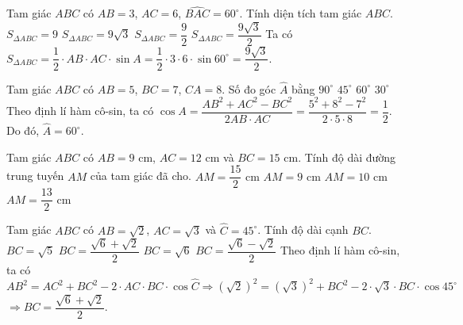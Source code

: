 \begin{ex}%
	Tam giác $ ABC$ có $ AB=3$, $AC=6$, $\widehat{BAC}=60^\circ $. Tính diện tích tam giác $ ABC$.
	\choice
	{$ S_{\Delta ABC}=9$}
	{$ S_{\Delta ABC}=9\sqrt{3}$}
	{$ S_{\Delta ABC}=\dfrac{9}{2}$}
	{\True $ S_{\Delta ABC}=\dfrac{9\sqrt{3}}{2}$}
	\loigiai
	{Ta có $ S_{\Delta ABC}=\dfrac{1}{2}\cdot AB\cdot AC\cdot \sin{A}=\dfrac{1}{2}\cdot 3\cdot 6\cdot \sin 60^\circ=\dfrac{9\sqrt{3}}{2}$.}
\end{ex}


\begin{ex}%
	Tam giác $ ABC$ có $ AB=5$, $BC=7$, $CA=8$. Số đo góc $ \widehat{A}$ bằng
	\choice
	{$ 90^\circ $}
	{$ 45^\circ $}
	{\True $ 60^\circ $}
	{$ 30^\circ $}
	\loigiai
	{Theo định lí hàm cô-sin, ta có $ \cos{A}=\dfrac{AB^2+AC^2-BC^2}{2AB\cdot AC}=\dfrac{5^2+8^2-7^2}{2\cdot 5\cdot 8}=\dfrac{1}{2}$.\\
		Do đó, $ \widehat{A}=60^\circ $.}
\end{ex}


\begin{ex}%
	Tam giác $ ABC$ có $ AB=9$ cm, $ AC=12$ cm và $ BC=15$ cm. Tính độ dài đường trung tuyến $ AM$ của tam giác đã cho.
	\choice
	{\True $ AM=\dfrac{15}{2}$ cm}
	{$ AM=9$ cm}
	{$ AM=10$ cm}
	{$ AM=\dfrac{13}{2}$ cm}
\end{ex}


\begin{ex}%
	Tam giác $ ABC$ có $ AB=\sqrt{2}$, $AC=\sqrt{3}$ và $ \widehat{C}=45^\circ $. Tính độ dài cạnh $ BC$.
	\choice
	{$ BC=\sqrt{5}$}
	{\True $ BC=\dfrac{\sqrt{6}+\sqrt{2}}{2}$}
	{$ BC=\sqrt{6}$}
	{$ BC=\dfrac{\sqrt{6}-\sqrt{2}}{2}$}
	\loigiai
	{Theo định lí hàm cô-sin, ta có\\
		$ AB^2=AC^2+BC^2-2\cdot AC\cdot BC\cdot \cos \widehat{C}\Rightarrow {(\sqrt{2} )}^2={(\sqrt{3} )}^2+BC^2-2\cdot \sqrt{3}\cdot BC\cdot \cos 45^\circ $ \\
		$ \Rightarrow BC=\dfrac{\sqrt{6}+\sqrt{2}}{2}$.}
\end{ex}


